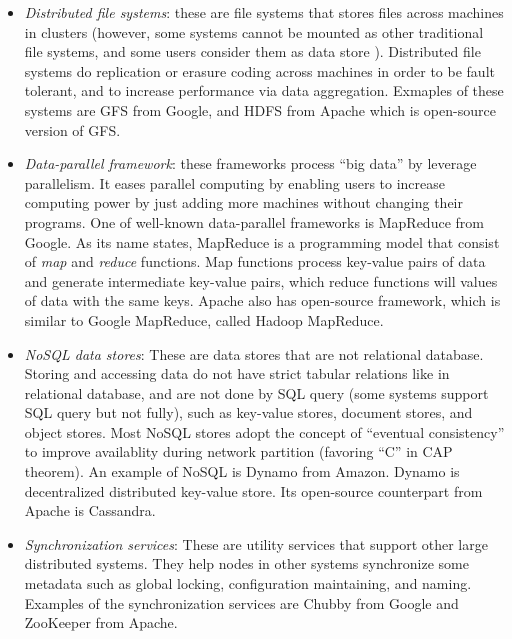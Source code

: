 \begin{itemize}

\item \textit{Distributed file systems}: these are file systems that stores
files across machines in clusters (however, some systems cannot be mounted as
other traditional file systems, and some users consider them as data store
\cite{HadoopStorage}). Distributed file systems do replication or erasure coding
across machines in order to be fault tolerant, and to increase performance via
data aggregation. Exmaples of these systems are GFS from Google, and HDFS from
Apache which is open-source version of GFS.

\item \textit{Data-parallel framework}: these frameworks process ``big data'' by
leverage parallelism. It eases parallel computing by enabling users to increase
computing power by just adding more machines without changing their programs.
One of well-known data-parallel frameworks is MapReduce from Google. As its name
states, MapReduce is a programming model that consist of \textit{map} and
\textit{reduce} functions. Map functions process key-value pairs of data and
generate intermediate key-value pairs, which reduce functions will values of
data with the same keys. Apache also has open-source framework, which is similar
to Google MapReduce, called Hadoop MapReduce.

\item \textit{NoSQL data stores}: These are data stores that are not relational
database. Storing and accessing data do not have strict tabular relations like
in relational database, and are not done by SQL query (some systems support SQL
query but not fully), such as key-value stores, document stores, and object
stores. Most NoSQL stores adopt the concept of ``eventual consistency'' to
improve availablity during network partition (favoring ``C'' in CAP theorem). An
example of NoSQL is Dynamo from Amazon. Dynamo is decentralized distributed
key-value store. Its open-source counterpart from Apache is Cassandra.

\item \textit{Synchronization services}: These are utility services that support
other large distributed systems. They help nodes in other systems synchronize
some metadata such as global locking, configuration maintaining, and naming.
Examples of the synchronization services are Chubby from Google and ZooKeeper
from Apache.

\end{itemize}
